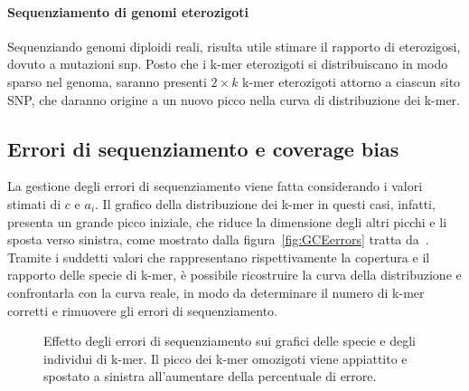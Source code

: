 \documentclass[crop=false, class=book]{standalone}
\begin{document}
	\paragraph{Sequenziamento di genomi eterozigoti}
	Sequenziando genomi diploidi reali, risulta utile stimare il rapporto di eterozigosi, dovuto a mutazioni \gls{snp}. Posto che i k-mer eterozigoti si distribuiscano in modo sparso nel genoma, saranno presenti $2\times k$ k-mer eterozigoti attorno a ciascun sito SNP, che daranno origine a un nuovo picco nella curva di distribuzione dei k-mer. 
	
	\subsection{Errori di sequenziamento e coverage bias}
	La gestione degli errori di sequenziamento viene fatta considerando i valori stimati di $c$ e $a_i$. Il grafico della distribuzione dei k-mer in questi casi, infatti, presenta un grande picco iniziale, che riduce la dimensione degli altri picchi e li sposta verso sinistra, come mostrato dalla figura~\vref{fig:GCEerrors} tratta da~\cite{liu2013GCE}. Tramite i suddetti valori che rappresentano rispettivamente la copertura e il rapporto delle specie di k-mer, è possibile ricostruire la curva della distribuzione e confrontarla con la curva reale, in modo da determinare il numero di k-mer corretti e rimuovere gli errori di sequenziamento.
	
	\begin{figure}[]
		\centering
		 \quad
		\caption{Effetto degli errori di sequenziamento sui grafici delle specie e degli individui di k-mer. Il picco dei k-mer omozigoti viene appiattito e spostato a sinistra all'aumentare della percentuale di errore.}
		\label{fig:GCEerrors}
	\end{figure}
	
\end{document}
